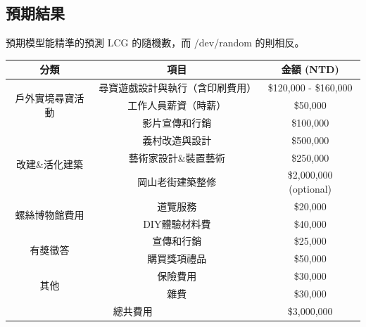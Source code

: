 \documentclass[a4paper, 12pt]{article}
\begin{document}
\begin{CJK}{UTF8}{bkai}
	\section{預期結果}
	預期模型能精準的預測 LCG 的隨機數，而 /dev/random 的則相反。
	\begin{table}[h]
		\centering
		\renewcommand{\arraystretch}{1} %
		\begin{tabular}{|c|c|c|}
			\hline
			分類 & 項目 & 金額 (NTD) \\
			\hline
			\multirow{3}{*}{戶外實境尋寶活動} & \multicolumn{1}{|c|}{尋寶遊戲設計與執行（含印刷費用）} & \$120,000 - \$160,000 \\
			\cline{2-3}
			& \multicolumn{1}{|c|}{工作人員薪資（時薪）} & \$50,000 \\
			\cline{2-3}
			& \multicolumn{1}{|c|}{影片宣傳和行銷} & \$100,000 \\
			\hline
			\multirow{3}{*}{改建\&活化建築} & \multicolumn{1}{|c|}{義村改造與設計} & \$500,000 \\
			\cline{2-3}
			& \multicolumn{1}{|c|}{藝術家設計\&裝置藝術} & \$250,000 \\
			\cline{2-3}
			& \multicolumn{1}{|c|}{岡山老街建築整修} & \$2,000,000 (optional) \\
			\hline
			\multirow{2}{*}{螺絲博物館費用} & \multicolumn{1}{|c|}{道覽服務} & \$20,000 \\
			\cline{2-3}
			& \multicolumn{1}{|c|}{DIY體驗材料費} & \$40,000 \\
			\hline
			\multirow{2}{*}{有獎徵答} & \multicolumn{1}{|c|}{宣傳和行銷} & \$25,000 \\
			\cline{2-3}
			& \multicolumn{1}{|c|}{購買獎項禮品} & \$50,000 \\
			\hline
			\multirow{2}{*}{其他} & \multicolumn{1}{|c|}{保險費用} & \$30,000 \\
			\cline{2-3}
			& \multicolumn{1}{|c|}{雜費} & \$30,000 \\
			\hline
			\multicolumn{2}{|c|}{總共費用} & \$3,000,000 \\
			\hline
		\end{tabular}
	\end{table}
	
\end{CJK}
\end{document}
